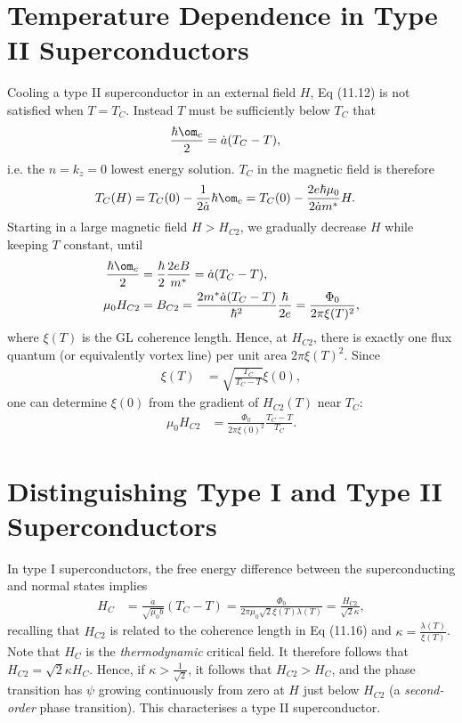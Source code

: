 \documentclass[a4paper, 11pt, normalem]{report}
\begin{document}
\section{Temperature Dependence in Type II Superconductors}
Cooling a type II superconductor in an external field $H$, Eq (11.12) is not satisfied when $T=T_C$.
Instead $T$ must be sufficiently below $T_C$ that
\begin{align}
    \frac{\hbar\om_c}{2} &= \dot{a}(T_C-T),
\end{align}
i.e. the $n=k_z=0$ lowest energy solution.
$T_C$ in the magnetic field is therefore
\begin{align}
    T_C(H) &= T_C(0) - \frac{1}{2\dot{a}}\hbar\om_c = T_C(0) - \frac{2e\hbar\mu_0}{2\dot{a}m^*}H.
\end{align}
Starting in a large magnetic field $H>H_{C2}$, we gradually decrease $H$ while keeping $T$ constant, until
\begin{align}
    \frac{\hbar\om_c}{2} &= \frac{\hbar}{2}\frac{2eB}{m^*} = \dot{a}(T_C-T), \\
    \mu_0H_{C2} &= B_{C2} = \frac{2m^*\dot{a}(T_C-T)}{\hbar^2}\frac{\hbar}{2e} = \frac{\Phi_0}{2\pi\xi(T)^2},
\end{align}
where $\xi(T)$ is the GL coherence length.
Hence, at $H_{C2}$, there is exactly one flux quantum (or equivalently vortex line) per unit area $2\pi\xi(T)^2$.
Since
\begin{align}
    \xi(T) &= \sqrt{\frac{T_C}{T_C-T}}\xi(0),
\end{align}
one can determine $\xi(0)$ from the gradient of $H_{C2}(T)$ near $T_C$:
\begin{align}
    \mu_0H_{C2} &= \frac{\Phi_0}{2\pi\xi(0)^2}\frac{T_C-T}{T_C}.
\end{align}

\section{Distinguishing Type I and Type II Superconductors}
In type I superconductors, the free energy difference between the superconducting and normal states implies
\begin{align}
    H_C &= \frac{\dot{a}}{\sqrt{\mu_0b}}(T_C-T) = \frac{\Phi_0}{2\pi\mu_0\sqrt{2}\xi(T)\lambda(T)} = \frac{H_{C2}}{\sqrt{2}\kappa},
\end{align}
recalling that $H_{C2}$ is related to the coherence length in Eq (11.16) and $\kappa=\frac{\lambda(T)}{\xi(T)}$.
Note that $H_C$ is the \emph{thermodynamic} critical field.
It therefore follows that $H_{C2} = \sqrt{2}\kappa H_C$.
Hence, if $\kappa>\frac{1}{\sqrt{2}}$, it follows that $H_{C2}>H_C$, and the phase transition has $\psi$ growing continuously from zero at $H$ just below $H_{C2}$ (a \emph{second-order} phase transition).
This characterises a type II superconductor.
\end{document}
